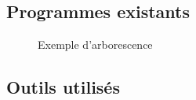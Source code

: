 

\subsection{Programmes existants}\label{ssec:contexte_programmes}

\begin{figure}[!h]
\centering
\begin{minipage}{4cm}
\end{minipage}
\caption{Exemple d'arborescence}
\label{fig:dirtree_example}
\end{figure}


\subsection{Outils utilisés}\label{ssec:outils}

